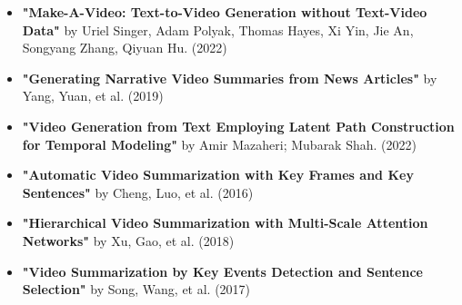\documentclass[12pt]{article}
\begin{document}
  \begin{itemize}

    \item
    \textbf{"Make-A-Video: Text-to-Video Generation without Text-Video Data"} by Uriel Singer, Adam Polyak, Thomas Hayes, Xi Yin, Jie An, Songyang Zhang, Qiyuan Hu. (2022)

  \item \textbf{"Generating Narrative Video Summaries from News Articles"} by Yang, Yuan, et al. (2019)

  \item
    \textbf{"Video Generation from Text Employing Latent Path Construction for Temporal Modeling"} by Amir Mazaheri; Mubarak Shah. (2022)
  \item
    \textbf{"Automatic Video Summarization with Key Frames and Key Sentences"} by Cheng, Luo, et al. (2016)
  \item \textbf{"Hierarchical Video Summarization with Multi-Scale Attention Networks"} by Xu, Gao, et al. (2018)
  \item
    \textbf{"Video Summarization by Key Events Detection and Sentence Selection"} by Song, Wang, et al. (2017)

  \end{itemize}
\\



\noindent  

\noindent  

\noindent  

\noindent  

\noindent  

\noindent  

\noindent  

\noindent  

\noindent  

\noindent  

\noindent  

\noindent  
\pagebreak{}
\end{document}

